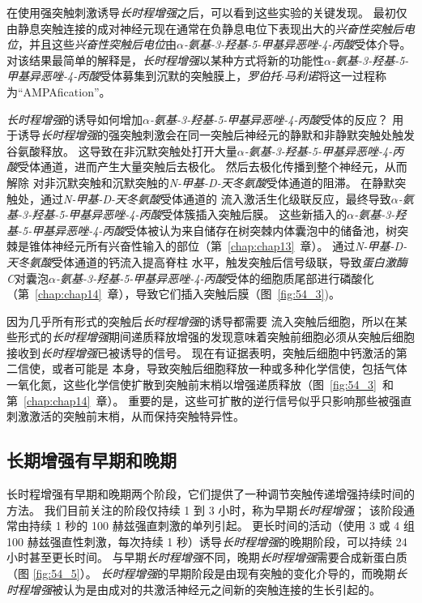 在使用强突触刺激诱导\textit{长时程增强}之后，可以看到这些实验的关键发现。
最初仅由静息突触连接的成对神经元现在通常在负静息电位下表现出大的\textit{兴奋性突触后电位}，并且这些\textit{兴奋性突触后电位}由\textit{$\alpha$-氨基-3-羟基-5-甲基异恶唑-4-丙酸}受体介导。
对该结果最简单的解释是，\textit{长时程增强}以某种方式将新的功能性\textit{$\alpha$-氨基-3-羟基-5-甲基异恶唑-4-丙酸}受体募集到沉默的突触膜上，\textit{罗伯托$\cdot$马利诺}将这一过程称为“AMPAfication”。


\textit{长时程增强}的诱导如何增加\textit{$\alpha$-氨基-3-羟基-5-甲基异恶唑-4-丙酸}受体的反应？
用于诱导\textit{长时程增强}的强突触刺激会在同一突触后神经元的静默和非静默突触处触发谷氨酸释放。
这导致在非沉默突触处打开大量\textit{$\alpha$-氨基-3-羟基-5-甲基异恶唑-4-丙酸}受体通道，进而产生大量突触后去极化。
然后去极化传播到整个神经元，从而解除  对非沉默突触和沉默突触的\textit{N-甲基-D-天冬氨酸}受体通道的阻滞。
在静默突触处，通过\textit{N-甲基-D-天冬氨酸}受体通道的  流入激活生化级联反应，最终导致\textit{$\alpha$-氨基-3-羟基-5-甲基异恶唑-4-丙酸}受体簇插入突触后膜。
这些新插入的\textit{$\alpha$-氨基-3-羟基-5-甲基异恶唑-4-丙酸}受体被认为来自储存在树突棘内体囊泡中的储备池，树突棘是锥体神经元所有兴奋性输入的部位（第~\ref{chap:chap13}~章）。
通过\textit{N-甲基-D-天冬氨酸}受体通道的钙流入提高脊柱  水平，触发突触后信号级联，导致\textit{蛋白激酶C}对囊泡\textit{$\alpha$-氨基-3-羟基-5-甲基异恶唑-4-丙酸}受体的细胞质尾部进行磷酸化（第~\ref{chap:chap14}~章），导致它们插入突触后膜（图~\ref{fig:54_3})。


因为几乎所有形式的突触后\textit{长时程增强}的诱导都需要  流入突触后细胞，所以在某些形式的\textit{长时程增强}期间递质释放增强的发现意味着突触前细胞必须从突触后细胞接收到\textit{长时程增强}已被诱导的信号。
现在有证据表明，突触后细胞中钙激活的第二信使，或者可能是  本身，导致突触后细胞释放一种或多种化学信使，包括气体一氧化氮，这些化学信使扩散到突触前末梢以增强递质释放（图~\ref{fig:54_3}~和第~\ref{chap:chap14}~章）。
重要的是，这些可扩散的逆行信号似乎只影响那些被强直刺激激活的突触前末梢，从而保持突触特异性。



\subsection{长期增强有早期和晚期}

长时程增强有早期和晚期两个阶段，它们提供了一种调节突触传递增强持续时间的方法。
我们目前关注的阶段仅持续 1 到 3 小时，称为早期\textit{长时程增强}；
该阶段通常由持续 1 秒的 100 赫兹强直刺激的单列引起。
更长时间的活动（使用 3 或 4 组 100 赫兹强直性刺激，每次持续 1 秒）诱导\textit{长时程增强}的晚期阶段，可以持续 24 小时甚至更长时间。
与早期\textit{长时程增强}不同，晚期\textit{长时程增强}需要合成新蛋白质（图 \ref{fig:54_5}）。
\textit{长时程增强}的早期阶段是由现有突触的变化介导的，而晚期\textit{长时程增强}被认为是由成对的共激活神经元之间新的突触连接的生长引起的。


